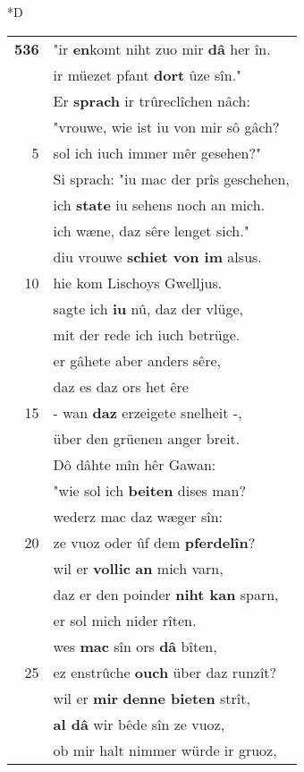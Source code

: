 \documentclass[8pt,a4paper,notitlepage]{article}
\begin{document}
\begin{table}[ht]
\begin{minipage}[t]{0.5\linewidth}
\small
\begin{center}*D
\end{center}
\begin{tabular}{rl}
\textbf{536} & "ir \textbf{en}komt niht zuo mir \textbf{dâ} her în.\\ 
 & ir müezet pfant \textbf{dort} ûze sîn."\\ 
 & Er \textbf{sprach} ir trûreclîchen nâch:\\ 
 & "vrouwe, wie ist iu von mir sô gâch?\\ 
5 & sol ich iuch immer mêr gesehen?"\\ 
 & Si sprach: "iu mac der prîs geschehen,\\ 
 & ich \textbf{state} iu sehens noch an mich.\\ 
 & ich wæne, daz sêre lenget sich."\\ 
 & diu vrouwe \textbf{schiet von im} alsus.\\ 
10 & hie kom Lischoys Gwelljus.\\ 
 & sagte ich \textbf{iu} nû, daz der vlüge,\\ 
 & mit der rede ich iuch betrüge.\\ 
 & er gâhete aber anders sêre,\\ 
 & daz es daz ors het êre\\ 
15 & - wan \textbf{daz} erzeigete snelheit -,\\ 
 & über den grüenen anger breit.\\ 
 & Dô dâhte mîn hêr Gawan:\\ 
 & "wie sol ich \textbf{beiten} dises man?\\ 
 & wederz mac daz wæger sîn:\\ 
20 & ze vuoz oder ûf dem \textbf{pferdelîn}?\\ 
 & wil er \textbf{vollic} \textbf{an} mich varn,\\ 
 & daz er den poinder \textbf{niht kan} sparn,\\ 
 & er sol mich nider rîten.\\ 
 & wes \textbf{mac} sîn ors \textbf{dâ} bîten,\\ 
25 & ez enstrûche \textbf{ouch} über daz runzît?\\ 
 & wil er \textbf{mir} \textbf{denne bieten} strît,\\ 
 & \textbf{al dâ} wir bêde sîn ze vuoz,\\ 
 & ob mir halt nimmer würde ir gruoz,\\ 

\end{tabular}
\end{minipage}
\end{table}
\end{document}
